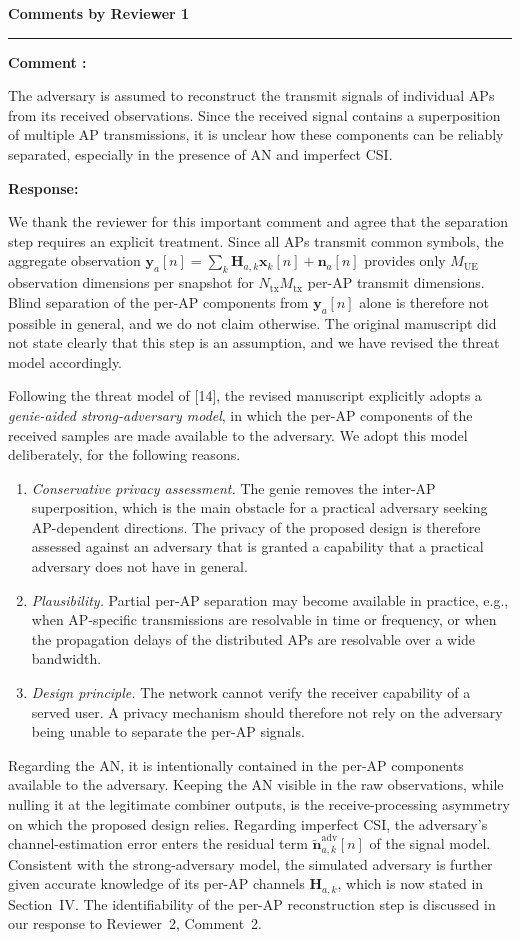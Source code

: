 \documentclass[a4paper,12pt]{article}
\newcounter{reviewcomment}
\newcommand{\reviewer}[1]{%
  \clearpage
  \setcounter{reviewcomment}{0}%
  {\color{blue}\large\bfseries Comments by #1\par}
  {\color{blue}\rule{\linewidth}{0.15em}}\par
}
\newenvironment{reviewcomment}{%
  \stepcounter{reviewcomment}%
  \begin{shaded}
  \textbf{Comment \thereviewcomment:}\par
}{\end{shaded}}
\newenvironment{response}{\par\textbf{Response:}\par}{\par}
\begin{document}
\reviewer{Reviewer 1}
\begin{reviewcomment}
The adversary is assumed to reconstruct the transmit signals of individual
APs from its received observations. Since the received signal contains a
superposition of multiple AP transmissions, it is unclear how these
components can be reliably separated, especially in the presence of AN and
imperfect CSI.
\end{reviewcomment}
\begin{response}
We thank the reviewer for this important comment and agree that the
separation step requires an explicit treatment. Since all APs transmit common
symbols, the aggregate observation
$\mathbf{y}_a[n]=\sum_{k}\mathbf{H}_{a,k}\mathbf{x}_k[n]+\mathbf{n}_a[n]$
provides only $M_{\mathrm{UE}}$ observation dimensions per snapshot for
$N_{\mathrm{tx}}M_{\mathrm{tx}}$ per-AP transmit dimensions. Blind separation
of the per-AP components from $\mathbf{y}_a[n]$ alone is therefore not
possible in general, and we do not claim otherwise. The original manuscript
did not state clearly that this step is an assumption, and we have revised
the threat model accordingly.

Following the threat model of [14], the revised manuscript explicitly adopts
a \emph{genie-aided strong-adversary model}, in which the per-AP components
of the received samples are made available to the adversary. We adopt this
model deliberately, for the following reasons.
\begin{enumerate}
  \item \emph{Conservative privacy assessment.} The genie removes the
  inter-AP superposition, which is the main obstacle for a practical
  adversary seeking AP-dependent directions. The privacy of the proposed
  design is therefore assessed against an adversary that is granted a
  capability that a practical adversary does not have in general.
  \item \emph{Plausibility.} Partial per-AP separation may become available
  in practice, e.g., when AP-specific transmissions are resolvable in time
  or frequency, or when the propagation delays of the distributed APs are
  resolvable over a wide bandwidth.
  \item \emph{Design principle.} The network cannot verify the receiver
  capability of a served user. A privacy mechanism should therefore not
  rely on the adversary being unable to separate the per-AP signals.
\end{enumerate}

Regarding the AN, it is intentionally contained in the per-AP components
available to the adversary. Keeping the AN visible in the raw observations,
while nulling it at the legitimate combiner outputs, is the
receive-processing asymmetry on which the proposed design relies. Regarding
imperfect CSI, the adversary's channel-estimation error enters the residual
term $\widetilde{\mathbf{n}}_{a,k}^{\mathrm{adv}}[n]$ of the signal model.
Consistent with the strong-adversary model, the simulated adversary is
further given accurate knowledge of its per-AP channels $\mathbf{H}_{a,k}$,
which is now stated in Section~IV. The identifiability of the per-AP
reconstruction step is discussed in our response to Reviewer~2, Comment~2.
\end{response}
\end{document}
